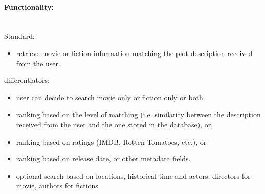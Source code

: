 \documentclass{article}
\begin{document}
    \paragraph*{Functionality:} \ \\
    Standard: 
    \begin{itemize}
    \item retrieve movie or fiction information matching the plot description received from the user.
    \end{itemize}
    differentiators:
    \begin{itemize}
    \item user can decide to search movie only or fiction only or both
    \item ranking based on the level of matching (i.e. similarity between the description received from the user and the one stored in the database), or, 
    \item ranking based on ratings (IMDB, Rotten Tomatoes, etc.), or
    \item ranking based on release date, or other metadata fields. 
    \item optional search based on locations, historical time and actors, directors for movie, authors for fictions
    \end{itemize}
\end{document}
